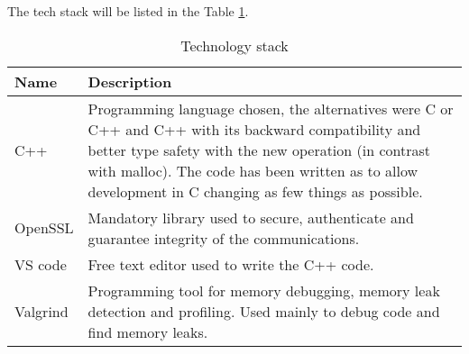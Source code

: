 The tech stack will be listed in the Table \ref{tab:tech-stack}.
\begin{longtable}{|p{}|p{}|}
	\caption{Technology stack}
	\label{Technology stack} 
	\label{tab:tech-stack} \\
	\hline
	\textbf{Name} & \textbf{Description} \\
	\hline
	C++ & Programming language chosen, the alternatives were C or C++ and C++ with its backward compatibility and better type safety with the new operation (in contrast with malloc). The code has been written as to allow development in C changing as few things as possible. \\
	\hline
	OpenSSL & Mandatory library used to secure, authenticate and guarantee integrity of the communications. \\
	\hline
	VS code & Free text editor used to write the C++ code. \\
	\hline
	Valgrind & Programming tool for memory debugging, memory leak detection and profiling. Used mainly to debug code and find memory leaks. \\
	\hline
\end{longtable}%
	

